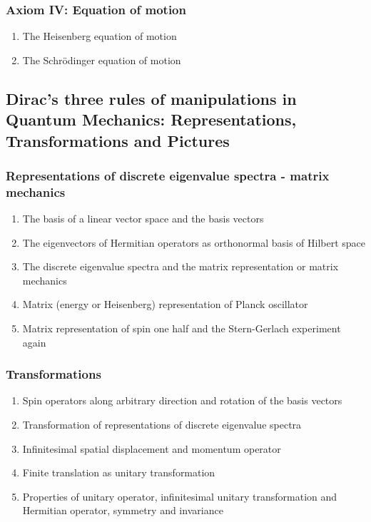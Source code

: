 \documentclass[12pt]{article}
\numberwithin{equation}{section}
\begin{document}
\subsubsection{Axiom IV: Equation of motion}
\begin{enumerate}
\item The Heisenberg equation of motion
\item The Schr\"{o}dinger equation of motion
\end{enumerate}
\subsection{Dirac's three rules of manipulations in Quantum Mechanics: 
                       Representations, Transformations and Pictures}
\subsubsection{Representations of discrete eigenvalue spectra - matrix mechanics}
\begin{enumerate}
\item The basis of a linear vector space and the basis vectors
\item The eigenvectors of Hermitian operators as orthonormal basis of Hilbert space
\item The discrete eigenvalue spectra and the matrix representation or matrix mechanics
\item Matrix (energy or Heisenberg) representation of Planck oscillator
\item Matrix representation of spin one half and the Stern-Gerlach experiment again
\end{enumerate}
\subsubsection{Transformations}
\begin{enumerate}
\item Spin operators along arbitrary direction and rotation of the basis vectors
\item Transformation of representations of discrete eigenvalue spectra
\item Infinitesimal spatial displacement and momentum operator
\item Finite translation as unitary transformation
\item Properties of unitary operator, infinitesimal unitary transformation and Hermitian operator, symmetry and invariance
\end{enumerate}
\end{document}
